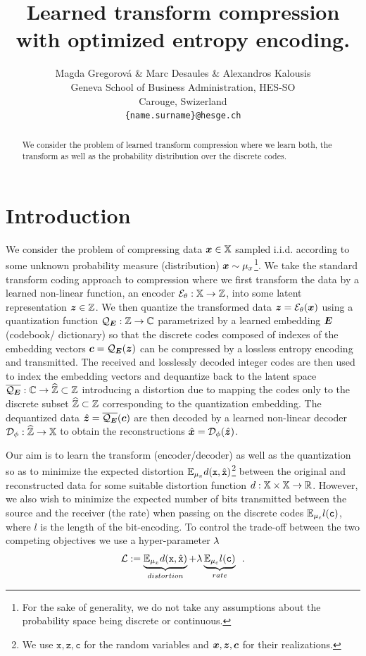 \documentclass{article} %
\title{Learned transform compression with optimized entropy encoding.}
\author{Magda Gregorová \& Marc Desaules \& Alexandros Kalousis \\
Geneva School of Business Administration, HES-SO \\
Carouge, Swizerland \\
\texttt{\{name.surname\}@hesge.ch} \\
}
\renewcommand{\rvx}{\mathtt{x}}
\renewcommand{\rvc}{\mathtt{c}}
\renewcommand{\rvz}{\mathtt{z}}
\newcommand{\mux}{\mu_x}
\newcommand{\muc}{\mu_c}
\newcommand{\gEt}{\gE_\theta}
\newcommand{\gQE}{\gQ_\mE}
\newcommand{\gDp}{\gD_\phi}
\newcommand{\vzh}{\hat{\vz}}
\newcommand{\vxh}{\hat{\vx}}
\begin{document}
\maketitle

\begin{abstract}
We consider the problem of learned transform compression where we learn both, the transform as well as the probability distribution over the discrete codes.
\end{abstract}

\section{Introduction}\label{sec:Intro}

We consider the problem of compressing data ${\bm{x}} \in {\mathbb{X}}$ sampled i.i.d. according to some unknown probability measure (distribution) $\vx \sim \mux$\footnote{For the sake of generality, we do not take any assumptions about the probability space being discrete or continuous.}.
We take the standard transform coding \citep{sayoodIntroductionDataCompression2012} approach to compression where we first transform the data by a learned non-linear function, an encoder $\gEt : \sX \to \sZ$, into some latent representation ${\bm{z}} \in {\mathbb{Z}}$.
We then quantize the transformed data $\vz = \gEt(\vx)$ using a quantization function $\gQE : \sZ \to \sC$ parametrized by a learned embedding ${\bm{E}}$ (codebook/ dictionary) so that the discrete codes composed of indexes of the embedding vectors $\vc = \gQE(\vz)$ can be compressed by a lossless entropy encoding and transmitted.
The received and losslessly decoded integer codes are then used to index the embedding vectors and dequantize back to the latent space $\overline{\gQE} : \sC \to \widehat{\sZ} \subset \sZ$ introducing a distortion due to mapping the codes only to the discrete subset $\widehat{{\mathbb{Z}}} \subset {\mathbb{Z}}$ corresponding to the quantization embedding.
The dequantized data $\vzh = \overline{\gQE}(\vc)$ are then decoded by a learned non-linear decoder $\gDp : \widehat{\sZ} \to \sX$ to obtain the reconstructions $\vxh = \gDp(\vzh)$.

Our aim is to learn the transform (encoder/decoder) as well as the quantization so as to minimize the expected distortion $\E_{\mux} d(\rvx, \hat{\rvx})$\footnote{We use $\rvx, \rvz, \rvc$ for the random variables and ${\bm{x}}, {\bm{z}}, {\bm{c}}$ for their realizations.} between the original and reconstructed data for some suitable distortion function $d : {\mathbb{X}} \times {\mathbb{X}} \to {\mathbb{R}}$.
However, we also wish to minimize the expected number of bits transmitted between the source and the receiver (the rate) when passing on the discrete codes $\E_{\muc} l(\rvc)$, where $l$ is the length of the bit-encoding.
To control the trade-off between the two competing objectives we use a hyper-parameter $\lambda$
\begin{align}\label{eq:trade_off}
\Ls := \underbrace{\E_{\mux} d(\rvx, \hat{\rvx})}_{distortion} + \reg \underbrace{\E_{\muc} l(\rvc)}_{rate} \enspace .
\end{align}
\end{document}
